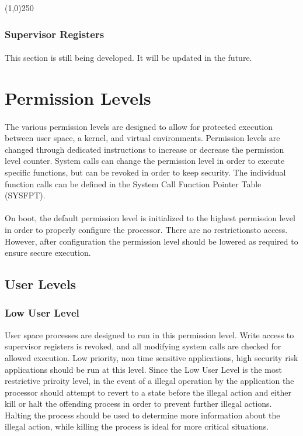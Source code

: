 \documentclass[letterpaper, 11pt]{article}
\begin{document}
\begin{center}
	\line(1,0){250}
\end{center}




\subsubsection{Supervisor Registers}
\paragraph{} This section is still being developed. It will be updated in the future.


\section{Permission Levels}
\paragraph{} The various permission levels are designed to allow for protected execution between user space, a kernel, and virtual
environments. Permission levels are changed through dedicated instructions to increase or decrease the permission level counter. System calls
can change the permission level in order to execute specific functions, but can be revoked in order to keep security. The individual function
calls can be defined in the System Call Function Pointer Table (SYSFPT). 
\paragraph{} On boot, the default permission level is initialized to the highest permission level in order to properly configure the processor.
There are no restrictionsto access. However, after configuration the permission level should be lowered as required to ensure secure execution.
\subsection{User Levels}

\subsubsection{Low User Level} User space processes are designed to run in this permission level. Write access to supervisor registers is revoked,
and all modifying system calls are checked for allowed execution. Low priority, non time sensitive applications, high security risk applications
should be run at this level. Since the Low User Level is the most restrictive priroity level, in the event of a illegal operation by the application
the processor should attempt to revert to a state before the illegal action and either kill or halt the offending process in order to prevent further
illegal actions. Halting the process should be used to determine more information about the illegal action, while killing the process is ideal for
more critical situations. 
\end{document}

